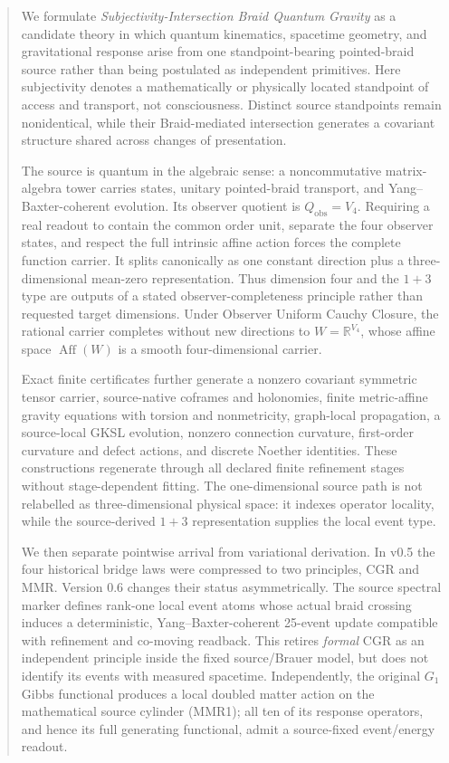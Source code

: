 \documentclass[11pt]{article}
\theoremstyle{definition}
\theoremstyle{remark}
\begin{document}
\begin{abstract}
We formulate \emph{Subjectivity-Intersection Braid Quantum Gravity} as a candidate theory in which quantum kinematics, spacetime geometry, and gravitational response arise from one standpoint-bearing pointed-braid source rather than being postulated as independent primitives. Here subjectivity denotes a mathematically or physically located standpoint of access and transport, not consciousness. Distinct source standpoints remain nonidentical, while their Braid-mediated intersection generates a covariant structure shared across changes of presentation.

The source is quantum in the algebraic sense: a noncommutative matrix-algebra tower carries states, unitary pointed-braid transport, and Yang--Baxter-coherent evolution. Its observer quotient is $Q_{\mathrm{obs}}=V_4$. Requiring a real readout to contain the common order unit, separate the four observer states, and respect the full intrinsic affine action forces the complete function carrier. It splits canonically as one constant direction plus a three-dimensional mean-zero representation. Thus dimension four and the $1+3$ type are outputs of a stated observer-completeness principle rather than requested target dimensions. Under Observer Uniform Cauchy Closure, the rational carrier completes without new directions to $W=\mathbb R^{V_4}$, whose affine space $\operatorname{Aff}(W)$ is a smooth four-dimensional carrier.

Exact finite certificates further generate a nonzero covariant symmetric tensor carrier, source-native coframes and holonomies, finite metric-affine gravity equations with torsion and nonmetricity, graph-local propagation, a source-local GKSL evolution, nonzero connection curvature, first-order curvature and defect actions, and discrete Noether identities. These constructions regenerate through all declared finite refinement stages without stage-dependent fitting. The one-dimensional source path is not relabelled as three-dimensional physical space: it indexes operator locality, while the source-derived $1+3$ representation supplies the local event type.

We then separate pointwise arrival from variational derivation. In v0.5 the four historical bridge laws were compressed to two principles, CGR and MMR. Version 0.6 changes their status asymmetrically. The source spectral marker defines rank-one local event atoms whose actual braid crossing induces a deterministic, Yang--Baxter-coherent 25-event update compatible with refinement and co-moving readback. This retires \emph{formal} CGR as an independent principle inside the fixed source/Brauer model, but does not identify its events with measured spacetime. Independently, the original $G_1$ Gibbs functional produces a local doubled matter action on the mathematical source cylinder (MMR1); all ten of its response operators, and hence its full generating functional, admit a source-fixed event/energy readout.


\end{abstract}
\end{document}
